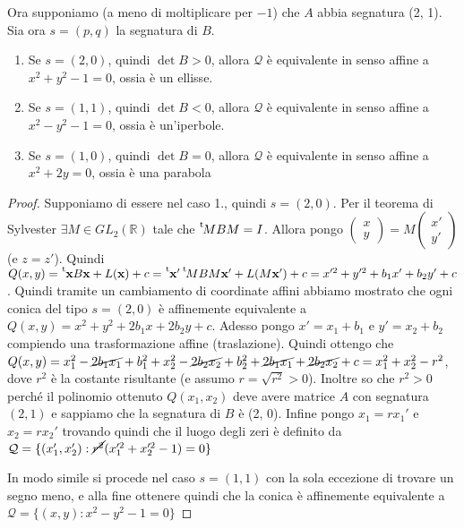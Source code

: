 \documentclass{article}
\newcommand*{\transp}[2][-3mu]{\ensuremath{\mskip1mu\prescript{\smash{\mathrm t\mkern#1}}{}{\mathstrut#2}}}%
\theoremstyle{plain}
\theoremstyle{definition}
\theoremstyle{remark}
\begin{document}
Ora supponiamo (a meno di moltiplicare per \(-1\)) che \(A\) abbia segnatura (2, 1). 
Sia ora \(s = (p, q)\) la segnatura di \(B\).
\begin{enumerate}[label = \arabic*.]
    \item Se \(s = (2, 0)\), quindi \(\det B > 0\),  allora \(\mathcal{Q}\) è equivalente in senso
        affine a \(x^2 + y^2 - 1 = 0\), ossia è un ellisse.
    \item Se \(s = (1, 1)\), quindi \(\det B < 0\), allora \(\mathcal{Q}\) è equivalente in senso affine
        a \(x^2 - y^2 - 1 = 0\), ossia è un'iperbole.
    \item Se \(s = (1, 0)\), quindi \(\det B = 0\), allora \(\mathcal{Q}\) è
        equivalente in senso affine a \(x^2 + 2y = 0\), ossia è una parabola
\end{enumerate}
\begin{proof}
    Supponiamo di essere nel caso 1., quindi \(s = (2, 0)\). Per il teorema
    di Sylvester \(\exists M \in GL_{2}(\mathbb{R})\) tale che \(\transp{M} B M =
    I\). Allora pongo \(\begin{pmatrix}
        x \\
        y
    \end{pmatrix} = M \begin{pmatrix}
        x' \\
        y' 
    \end{pmatrix}\) (e \(z = z'\)). Quindi \(Q(x, y) = \transp[-1mu]{\mathbf{x}} B
    \mathbf{x} + L(\mathbf{x}) + c = \transp[-1mu]{\mathbf{x}}' \transp{M} B M \mathbf{x}' +
    L(M \mathbf{x'}) + c = x'^2 + y'^2 + b_{1} x' + b_{2} y' + c\). Quindi
    tramite un cambiamento di coordinate affini abbiamo mostrato che ogni conica
    del tipo \(s = (2, 0)\) è affinemente equivalente a \(Q(x, y) = x^2 + y^2 +
    2b_{1}x + 2 b_{2}y + c\). Adesso pongo \(x' = x_{1} + b_{1}\) e \(y'= x_{2} +
    b_{2}\) compiendo una trasformazione affine (traslazione). Quindi ottengo
    che \(Q(x, y) = x_{1}^2 - \cancel{2b_{1}x_{1}} + b_{1}^2 + x_{2}^2 - \cancel{2b_{2}x_{2}} +
    b_{2}^2 + \cancel{2b_{1}x_{1}} + \cancel{2b_{2}x_{2}} + c = x_{1}^2 +
    x_{2}^2 - r^2 \), dove \(r^2\) è la costante risultante (e assumo \(r =
    \sqrt{r^2} > 0\)). Inoltre so che
    \(r^2 > 0\) perché il polinomio ottenuto \(Q(x_{1}, x_{2})\) deve avere
    matrice \(A\) con segnatura \((2, 1)\) e sappiamo che la segnatura di \(B\)
    è (2, 0). Infine pongo \(x_{1} = r x_{1}'\) e \(x_{2} = r x_{2}'\) trovando
    quindi che il luogo degli zeri è definito da \(\mathcal{Q} = \{(x_{1}',
    x_{2}') : \cancel{r^2}(x_{1}'^2 + x_{2}'^2 - 1) = 0\}\) 

    In modo simile si procede nel caso \(s = (1, 1)\) con la sola eccezione di
    trovare un segno meno, e alla fine ottenere quindi che la conica è
    affinemente equivalente a \(\mathcal{Q} = \{(x, y) : x^2 - y^2 - 1 = 0\} \) 
\end{proof}
\end{document}
